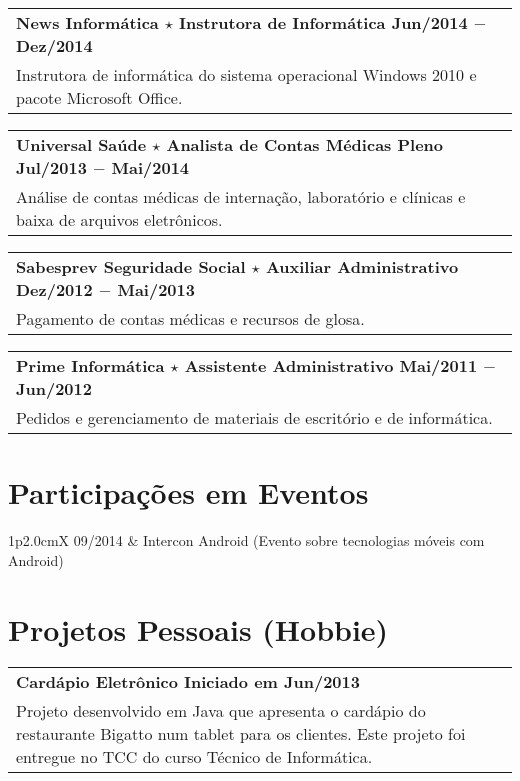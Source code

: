 \documentclass[a4paper, oneside, final]{scrartcl}
\newcommand{\vspc}{\vspace{0.15cm}} %
\newcommand{\vspcitem}{\vspace{0.1cm}} %
\begin{document}
\begin{center}
\begin{tabularx}{1\linewidth}{X}
{\bf News Informática $\star$ Instrutora de Informática \hfill Jun/2014 $-$ Dez/2014} \\
Instrutora de informática do sistema operacional Windows 2010 e pacote Microsoft Office. \vspc\\
\end{tabularx}

\begin{tabularx}{1\linewidth}{X}
{\bf Universal Saúde $\star$ Analista de Contas Médicas Pleno \hfill Jul/2013 $-$ Mai/2014} \\
Análise de contas médicas de internação, laboratório e clínicas e baixa de arquivos eletrônicos. \vspc\\
\end{tabularx}

\begin{tabularx}{1\linewidth}{X}
{\bf Sabesprev Seguridade Social $\star$ Auxiliar Administrativo \hfill Dez/2012 $-$ Mai/2013} \\
Pagamento de contas médicas e recursos de glosa. \vspc\\
\end{tabularx}

\begin{tabularx}{1\linewidth}{X}
{\bf Prime Informática $\star$ Assistente Administrativo \hfill Mai/2011 $-$ Jun/2012} \\
Pedidos e gerenciamento de materiais de escritório e de informática.\vspc\\
\end{tabularx}

\section{Participações em Eventos}
\begin{tabularx}{1\linewidth}{p{2.0cm}X}
09/2014    & Intercon Android (Evento sobre tecnologias móveis com Android) \vspcitem\\
\end{tabularx}


\section{Projetos Pessoais (Hobbie)}
\begin{tabularx}{1\linewidth}{X}
{\bf Cardápio Eletrônico \hfill Iniciado em Jun/2013} \\
Projeto desenvolvido em Java que apresenta o cardápio do restaurante Bigatto num tablet para os clientes. Este projeto foi entregue no TCC do curso Técnico de Informática. \vspc\\
\end{tabularx}


\end{center}
\end{document}
